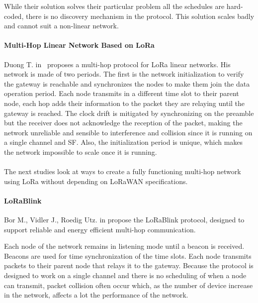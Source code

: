 While their solution solves their particular problem all the schedules are hard-coded,
there is no discovery mechanism in the protocol.
This solution scales badly and cannot suit a non-linear network.


\paragraph{Multi-Hop Linear Network Based on LoRa}

Duong T. in~\cite{duong2018} proposes a multi-hop protocol for LoRa linear
networks.
His network is made of two periods. The first is the network initialization to
verify the gateway is reachable and synchronizes the nodes to make them join the
data operation period.
Each node transmits in a different time slot to their parent node, each hop adds
their information to the packet they are relaying until the gateway is
reached.
The clock drift is mitigated by synchronizing on the preamble but the receiver
does not acknowledge the reception of the packet, making the network unreliable
and sensible to interference and collision since it is running on a
single channel and SF.
Also, the initialization period is unique, which makes the network impossible to
scale once it is running.

\paragraph{}

The next studies look at ways to create a fully functioning multi-hop network
using LoRa without depending on LoRaWAN specifications.

\paragraph{LoRaBlink}

Bor M., Vidler J., Roedig Utz. in \cite{lorablink} propose the LoRaBlink
protocol, designed to support reliable and energy efficient multi-hop
communication.

Each node of the network remains in listening mode until a beacon is received.
Beacons are used for time synchronization of the time slots.
Each node transmits packets to their parent node that relays it to the gateway.
Because the protocol is designed to work on a single channel and
there is no scheduling of when a node can transmit, packet collision often occur
which, as the number of device increase in the network, affects a lot the
performance of the network.

